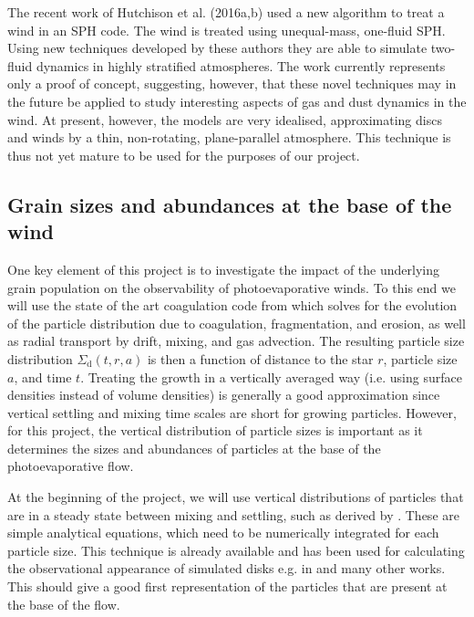 \documentclass[10pt,fleqn,twoside]{article}
\begin{document}
The recent work of Hutchison et al. (2016a,b) used a new algorithm to
treat a wind in an SPH code. The wind is
treated using unequal-mass, one-fluid SPH. Using new techniques
developed by these authors they are able to simulate two-fluid dynamics
in highly stratified atmospheres. The work currently represents 
only a proof of concept, suggesting, however, that these novel
techniques may in 
the future be applied to study interesting aspects of gas and dust
dynamics in the wind. At present, however, the models are very
idealised, approximating discs and winds by a thin, non-rotating,
plane-parallel atmosphere.  This technique is thus not yet mature to
be used for the purposes of our project.

\subsection{Grain sizes and abundances at the base of the wind}

One key element of this project is to investigate the impact of the
underlying grain population on the observability of photoevaporative
winds. To this end we will use the state of the art coagulation code
from \citet{2010A&A...513A..79B} which solves for the evolution of the
particle distribution due to coagulation, fragmentation, and erosion,
as well as radial transport by drift, mixing, and gas advection. The
resulting particle size distribution $\Sigma_\mathrm{d}(t,r,a)$ is
then a function of distance to the star $r$, particle size $a$, and
time $t$. Treating the growth in a vertically averaged way (i.e.
using surface densities instead of volume densities) is generally a
good approximation since vertical settling and mixing time scales are
short for growing particles. However, for this project, the vertical
distribution of particle sizes is important as it determines the sizes
and abundances of particles at the base of the photoevaporative flow.

At the beginning of the project, we will use vertical distributions of
particles that are in a steady state between mixing and settling, such
as derived by \citet{2009A&A...496..597F}. These are simple analytical
equations, which need to be numerically integrated for each particle
size. This technique is already available and has been used for
calculating the observational appearance of simulated disks e.g.
in \citet{2015ApJ...813L..14B} and many other works. This should give
a good first representation of the particles that are present at the
base of the flow.
\end{document}
